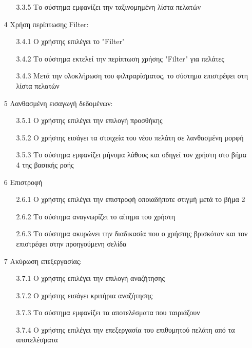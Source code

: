 \documentclass[12pt,a4paper,twoside]{book}
\begin{document}
\begin{enumerate}
\begin{enumerate}
          \item[3.3.5 ] Το σύστημα εμφανίζει την ταξινομημένη λίστα πελατών
        \end{enumerate}
  \item[4 ] Χρήση περίπτωσης Filter:
        \begin{enumerate}
          \item[3.4.1 ] Ο χρήστης επιλέγει το "Filter"  %
          \item[3.4.2 ] Το σύστημα εκτελεί την περίπτωση χρήσης "Filter" για πελάτες %
          \item[3.4.3 ] Μετά την ολοκλήρωση του φιλτραρίσματος, το σύστημα επιστρέφει στη λίστα πελατών
        \end{enumerate}
  \item[5 ] Λανθασμένη εισαγωγή δεδομένων: %
        \begin{enumerate}
          \item[3.5.1 ] Ο χρήστης επιλέγει την επιλογή προσθήκης
          \item[3.5.2 ] Ο χρήστης εισάγει τα στοιχεία του νέου πελάτη σε λανθασμένη μορφή
          \item[3.5.3 ] Το σύστημα εμφανίζει μήνυμα λάθους και οδηγεί τον χρήστη στο βήμα 4 της βασικής ροής %
        \end{enumerate}
  \item[6 ] Επιστροφή
        \begin{enumerate}
          \item[2.6.1 ] Ο χρήστης επιλέγει την επιστροφή οποιαδήποτε στιγμή μετά το βήμα 2 %
          \item[2.6.2 ] Το σύστημα αναγνωρίζει το αίτημα του χρήστη %
          \item[2.6.3 ] Το σύστημα ακυρώνει την διαδικασία που ο χρήστης βρισκόταν και τον επιστρέφει στην προηγούμενη σελίδα %
        \end{enumerate}
  \item[7 ] Ακύρωση επεξεργασίας:
        \begin{enumerate}
          \item[3.7.1 ] Ο χρήστης επιλέγει την επιλογή αναζήτησης
          \item[3.7.2 ] Ο χρήστης εισάγει κριτήρια αναζήτησης %
          \item[3.7.3 ] Το σύστημα εμφανίζει τα αποτελέσματα που ταιριάζουν
          \item[3.7.4 ] Ο χρήστης επιλέγει την επεξεργασία του επιθυμητού πελάτη από τα αποτελέσματα

\end{enumerate}
\end{enumerate}
\end{document}
